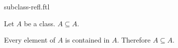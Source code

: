 \documentclass{article}
\begin{document}
\begin{smodule}{subclass-refl.ftl}

  \begin{proposition}[label=5994555614691328]
    Let $A$ be a class.
    $A \subseteq A$.
  \end{proposition}
  \begin{fproof*}
    Every element of $A$ is contained in $A$.
    Therefore $A \subseteq A$.
  \end{fproof*}
\end{smodule}
\end{document}
